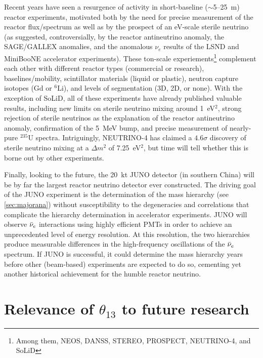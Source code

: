 \documentclass[../thesis.tex]{subfiles}
\begin{document}
Recent years have seen a resurgence of activity in short-baseline
($\sim$5--25~m) reactor experiments, motivated both by the need for precise
measurement of the reactor flux/spectrum as well as by the prospect of an
eV-scale sterile neutrino (as suggested, controversially, by the reactor
antineutrino anomaly, the SAGE/GALLEX anomalies, and the anomalous $\nu_e$
results of the LSND and MiniBooNE accelerator experiments). These ton-scale
experiements\footnote{Among them, NEOS, DANSS, STEREO, PROSPECT, NEUTRINO-4, and
  SoLiD} complement each other with different reactor types (commercial or
research), baselines/mobility, scintillator materials (liquid or plastic),
neutron capture isotopes (Gd or $^6$Li), and levels of segmentation (3D, 2D, or
none). With the exception of SoLiD, all of these experiments have already
published valuable results, including new limits on sterile neutrino mixing
around 1~eV$^2$, strong rejection of sterile neutrinos as the explanation of the
reactor antineutrino anomaly, confirmation of the 5~MeV bump, and precise
measurement of nearly-pure $^{235}$U spectra. Intriguingly, NEUTRINO-4 has
claimed a $4.6\sigma$ discovery of sterile neutrino mixing at a $\Delta m^2$ of
7.25~eV$^2$, but time will tell whether this is borne out by other experiments.

Finally, looking to the future, the 20~kt JUNO detector (in southern China) will
be by far the largest reactor neutrino detector ever constructed. The driving
goal of the JUNO experiment is the determination of the mass hierarchy (see
\autoref{sec:majorana}) without susceptibility to the degeneracies and
correlations that complicate the hierarchy determination in accelerator
experiments. JUNO will observe $\bar\nu_e$ interactions using highly efficient
PMTs in order to achieve an unprecedented level of energy resolution. At this
resolution, the two hierarchies produce measurable differences in the
high-frequency oscillations of the $\bar\nu_e$ spectrum. If JUNO is successful,
it could determine the mass hierarchy years before other (beam-based)
experiments are expected to do so, cementing yet another historical achievement
for the humble reactor neutrino.

\section{Relevance of $\theta_{13}$ to future research}
\label{sec:futureRelevance}
\end{document}
